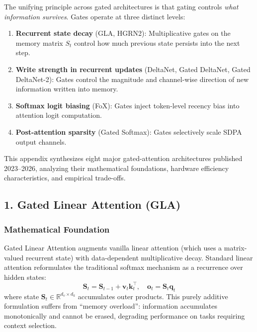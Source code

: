 \documentclass[11pt,a4paper]{article}
\begin{document}
The unifying principle across gated architectures is that gating controls \textit{what information survives}. Gates operate at three distinct levels:
\begin{enumerate}[leftmargin=*]
    \item \textbf{Recurrent state decay} (GLA, HGRN2): Multiplicative gates on the memory matrix $S_t$ control how much previous state persists into the next step.
    \item \textbf{Write strength in recurrent updates} (DeltaNet, Gated DeltaNet, Gated DeltaNet-2): Gates control the magnitude and channel-wise direction of new information written into memory.
    \item \textbf{Softmax logit biasing} (FoX): Gates inject token-level recency bias into attention logit computation.
    \item \textbf{Post-attention sparsity} (Gated Softmax): Gates selectively scale SDPA output channels.
\end{enumerate}

This appendix synthesizes eight major gated-attention architectures published 2023--2026, analyzing their mathematical foundations, hardware efficiency characteristics, and empirical trade-offs.

\subsection{1. Gated Linear Attention (GLA)}

\subsubsection{Mathematical Foundation}

Gated Linear Attention \citep{yang_gla_2023} augments vanilla linear attention (which uses a matrix-valued recurrent state) with data-dependent multiplicative decay. Standard linear attention reformulates the traditional softmax mechanism as a recurrence over hidden states:
\[
\mathbf{S}_t = \mathbf{S}_{t-1} + \mathbf{v}_t \mathbf{k}_t^\top, \quad \mathbf{o}_t = \mathbf{S}_t \mathbf{q}_t
\]
where state $\mathbf{S}_t \in \mathbb{R}^{d_v \times d_k}$ accumulates outer products. This purely additive formulation suffers from ``memory overload'': information accumulates monotonically and cannot be erased, degrading performance on tasks requiring context selection.
\end{document}
